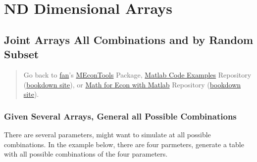 \documentclass[
]{book}
\begin{document}
\hypertarget{nd-dimensional-arrays}{%
\section{ND Dimensional Arrays}\label{nd-dimensional-arrays}}

\hypertarget{joint-arrays-all-combinations-and-by-random-subset}{%
\subsection{Joint Arrays All Combinations and by Random Subset}\label{joint-arrays-all-combinations-and-by-random-subset}}

\begin{quote}
Go back to \href{http://fanwangecon.github.io/}{fan}'s \href{https://fanwangecon.github.io/MEconTools/}{MEconTools} Package, \href{https://fanwangecon.github.io/M4Econ/}{Matlab Code Examples} Repository (\href{https://fanwangecon.github.io/M4Econ/bookdown}{bookdown site}), or \href{https://fanwangecon.github.io/Math4Econ/}{Math for Econ with Matlab} Repository (\href{https://fanwangecon.github.io/Math4Econ/bookdown}{bookdown site}).
\end{quote}

\hypertarget{given-several-arrays-general-all-possible-combinations}{%
\subsubsection{Given Several Arrays, General all Possible Combinations}\label{given-several-arrays-general-all-possible-combinations}}

There are several parameters, might want to simulate at all possible
combinations. In the example below, there are four parmeters, generate a
table with all possible combinations of the four parameters.
\end{document}
